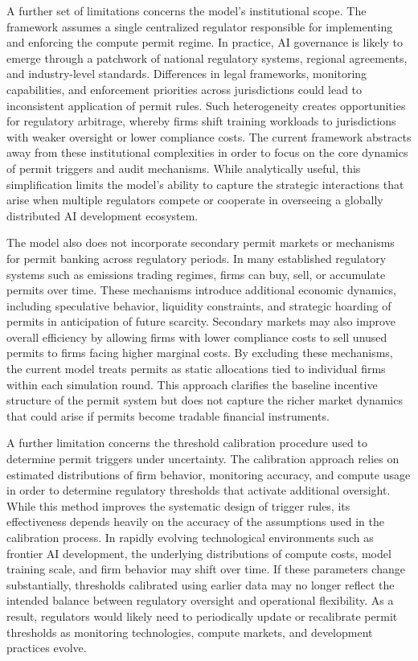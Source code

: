A further set of limitations concerns the model's institutional scope. The framework assumes a single centralized regulator responsible for implementing and enforcing the compute permit regime. In practice, AI governance is likely to emerge through a patchwork of national regulatory systems, regional agreements, and industry-level standards. Differences in legal frameworks, monitoring capabilities, and enforcement priorities across jurisdictions could lead to inconsistent application of permit rules. Such heterogeneity creates opportunities for regulatory arbitrage, whereby firms shift training workloads to jurisdictions with weaker oversight or lower compliance costs. The current framework abstracts away from these institutional complexities in order to focus on the core dynamics of permit triggers and audit mechanisms. While analytically useful, this simplification limits the model's ability to capture the strategic interactions that arise when multiple regulators compete or cooperate in overseeing a globally distributed AI development ecosystem.

The model also does not incorporate secondary permit markets or mechanisms for permit banking across regulatory periods. In many established regulatory systems such as emissions trading regimes, firms can buy, sell, or accumulate permits over time. These mechanisms introduce additional economic dynamics, including speculative behavior, liquidity constraints, and strategic hoarding of permits in anticipation of future scarcity. Secondary markets may also improve overall efficiency by allowing firms with lower compliance costs to sell unused permits to firms facing higher marginal costs. By excluding these mechanisms, the current model treats permits as static allocations tied to individual firms within each simulation round. This approach clarifies the baseline incentive structure of the permit system but does not capture the richer market dynamics that could arise if permits become tradable financial instruments.

A further limitation concerns the threshold calibration procedure used to determine permit triggers under uncertainty. The calibration approach relies on estimated distributions of firm behavior, monitoring accuracy, and compute usage in order to determine regulatory thresholds that activate additional oversight. While this method improves the systematic design of trigger rules, its effectiveness depends heavily on the accuracy of the assumptions used in the calibration process. In rapidly evolving technological environments such as frontier AI development, the underlying distributions of compute costs, model training scale, and firm behavior may shift over time. If these parameters change substantially, thresholds calibrated using earlier data may no longer reflect the intended balance between regulatory oversight and operational flexibility. As a result, regulators would likely need to periodically update or recalibrate permit thresholds as monitoring technologies, compute markets, and development practices evolve.

